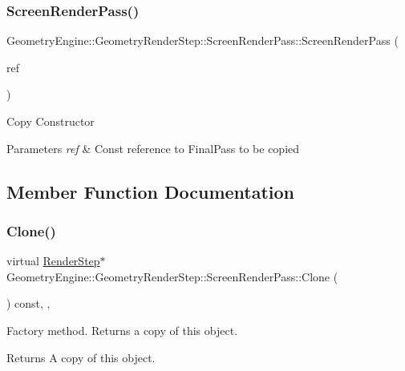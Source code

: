 \subsubsection{\texorpdfstring{ScreenRenderPass()}{ScreenRenderPass()}\hspace{0.1cm}{\footnotesize\ttfamily [4/4]}}
{\footnotesize\ttfamily Geometry\+Engine\+::\+Geometry\+Render\+Step\+::\+Screen\+Render\+Pass\+::\+Screen\+Render\+Pass (\begin{DoxyParamCaption}\item[{const \mbox{\hyperlink{class_geometry_engine_1_1_geometry_render_step_1_1_screen_render_pass}{Screen\+Render\+Pass}} \&}]{ref }\end{DoxyParamCaption})\hspace{0.3cm}{\ttfamily [inline]}}

Copy Constructor 
\begin{DoxyParams}{Parameters}
{\em ref} & Const reference to Final\+Pass to be copied \\
\hline
\end{DoxyParams}


\subsection{Member Function Documentation}
\mbox{\label{class_geometry_engine_1_1_geometry_render_step_1_1_screen_render_pass_a125bea5e92ff920b57012f9b0b177a1e}} 
\subsubsection{\texorpdfstring{Clone()}{Clone()}}
{\footnotesize\ttfamily virtual \mbox{\hyperlink{class_geometry_engine_1_1_geometry_render_step_1_1_render_step}{Render\+Step}}$\ast$ Geometry\+Engine\+::\+Geometry\+Render\+Step\+::\+Screen\+Render\+Pass\+::\+Clone (\begin{DoxyParamCaption}{ }\end{DoxyParamCaption}) const\hspace{0.3cm}{\ttfamily [inline]}, {\ttfamily [override]}, {\ttfamily [virtual]}}

Factory method. Returns a copy of this object. \begin{DoxyReturn}{Returns}
A copy of this object. 
\end{DoxyReturn}


